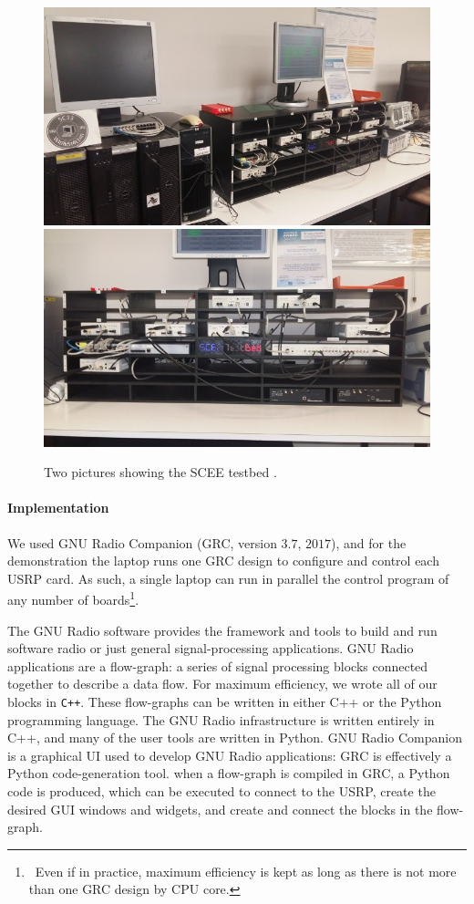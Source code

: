 \begin{figure}[!t]
    \centering
    \includegraphics[width=0.65\linewidth]{SCEE_TestBed1.jpg}
    \vspace*{20pt}
    \includegraphics[width=0.65\linewidth]{SCEE_TestBed2.jpg}
    \caption{Two pictures showing the SCEE testbed \cite[Appendix~3]{Bodinier17}.}
    \label{fig:42:photosSCEETestBed}
\end{figure}


\paragraph{Implementation}

We used GNU Radio Companion (GRC, version $3.7$, $2017$),
and for the demonstration the laptop runs
one GRC design to configure and control each USRP card.
As such, a single laptop can run in parallel the control program of any number of boards\footnote{~Even if in practice, maximum efficiency is kept as long as there is not more than one GRC design by CPU core.}.

The GNU Radio software provides the framework and tools to build and run software radio or just general signal-processing applications.
GNU Radio applications are a flow-graph: a series of signal processing blocks connected together to describe a data flow.
For maximum efficiency, we wrote all of our blocks in \texttt{C++}.
These flow-graphs can be written in either C++ or the Python programming language. The GNU Radio infrastructure is written entirely in C++, and many of the user tools are written in Python.
GNU Radio Companion is a graphical UI used to develop GNU Radio applications:
GRC is effectively a Python code-generation tool.
when a flow-graph is compiled in GRC, a Python code is produced, which can be executed to connect to the USRP,
create the desired GUI windows and widgets, and create and connect the blocks in the flow-graph.



